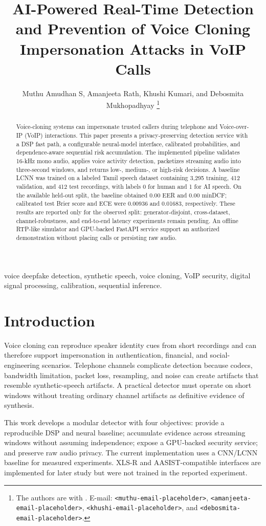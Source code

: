 \documentclass[journal]{IEEEtran}
\title{AI-Powered Real-Time Detection and Prevention of Voice Cloning Impersonation Attacks in VoIP Calls}
\author{Muthu Amudhan S, Amanjeeta Rath, Khushi Kumari, and Debosmita Mukhopadhyay%
\thanks{The authors are with \placeholder{Department and Institution, City, Country}. E-mail: \texttt{<muthu-email-placeholder>}, \texttt{<amanjeeta-email-placeholder>}, \texttt{<khushi-email-placeholder>}, and \texttt{<debosmita-email-placeholder>}.}}
\begin{document}
\maketitle

\begin{abstract}
Voice-cloning systems can impersonate trusted callers during telephone and Voice-over-IP (VoIP) interactions. This paper presents a privacy-preserving detection service with a DSP fast path, a configurable neural-model interface, calibrated probabilities, and dependence-aware sequential risk accumulation. The implemented pipeline validates 16-kHz mono audio, applies voice activity detection, packetizes streaming audio into three-second windows, and returns low-, medium-, or high-risk decisions. A baseline LCNN was trained on a labeled Tamil speech dataset containing 3,295 training, 412 validation, and 412 test recordings, with labels 0 for human and 1 for AI speech. On the available held-out split, the baseline obtained 0.00 EER and 0.00 minDCF; calibrated test Brier score and ECE were 0.00936 and 0.01683, respectively. These results are reported only for the observed split: generator-disjoint, cross-dataset, channel-robustness, and end-to-end latency experiments remain pending. An offline RTP-like simulator and GPU-backed FastAPI service support an authorized demonstration without placing calls or persisting raw audio.
\end{abstract}

\begin{IEEEkeywords}
voice deepfake detection, synthetic speech, voice cloning, VoIP security, digital signal processing, calibration, sequential inference.
\end{IEEEkeywords}

\section{Introduction}
Voice cloning can reproduce speaker identity cues from short recordings and can therefore support impersonation in authentication, financial, and social-engineering scenarios. Telephone channels complicate detection because codecs, bandwidth limitation, packet loss, resampling, and noise can create artifacts that resemble synthetic-speech artifacts. A practical detector must operate on short windows without treating ordinary channel artifacts as definitive evidence of synthesis.

This work develops a modular detector with four objectives: provide a reproducible DSP and neural baseline; accumulate evidence across streaming windows without assuming independence; expose a GPU-backed security service; and preserve raw audio privacy. The current implementation uses a CNN/LCNN baseline for measured experiments. XLS-R and AASIST-compatible interfaces are implemented for later study but were not trained in the reported experiment.
\end{document}
